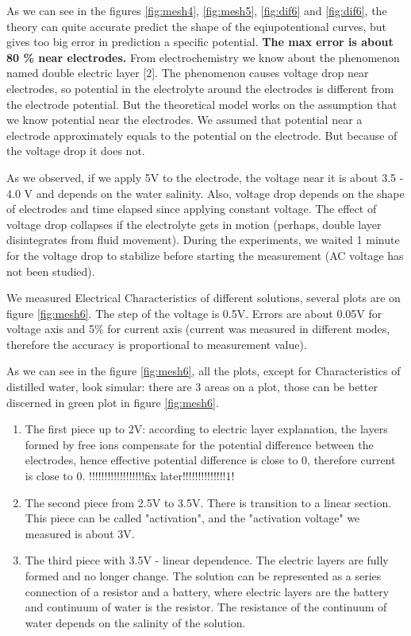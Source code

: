\documentclass{article}
\begin{document}
As we can see in the figures \ref{fig:mesh4}, \ref{fig:mesh5}, \ref{fig:dif6} and \ref{fig:dif6}, the theory can quite accurate predict the shape of the eqiupotentional curves, but gives too big error in prediction a specific potential. \textbf{The max error is about 80 \% near electrodes.} From electrochemistry we know about the phenomenon named double electric layer [2]. The phenomenon causes voltage drop near electrodes, so potential in the electrolyte around the electrodes is different from the electrode potential. But the theoretical model works on the assumption that we know potential near the electrodes. We assumed that potential near a electrode approximately equals to the potential on the electrode. But because of the voltage drop it does not. \par

As we observed, if we apply 5V to the electrode, the voltage near it is about 3.5 - 4.0 V and depends on the water salinity. Also, voltage drop depends on the shape of electrodes and time elapsed since applying constant voltage. The effect of voltage drop collapses if the electrolyte gets in motion (perhaps, double layer disintegrates from fluid movement). During the experiments, we waited 1 minute for the voltage drop to stabilize before starting the measurement (AC voltage has not been studied).\par

We measured Electrical Characteristics of different solutions, several plots are on figure \ref{fig:mesh6}. The step of the voltage is 0.5V. Errors are about 0.05V for voltage axis and 5\% for current axis (current was measured in different modes, therefore the accuracy is proportional to measurement value).

As we can see in the figure \ref{fig:mesh6}, all the plots, except for Characteristics of distilled water, look simular: there are 3 areas on a plot, those can be better discerned in green plot in figure \ref{fig:mesh6}. 

\begin{enumerate}   
\item The first piece up to 2V: according to electric layer explanation, the layers formed by free ions compensate for the potential difference between the electrodes, hence effective potential difference is close to 0, therefore current is close to 0.    !!!!!!!!!!!!!!!!!!fix later!!!!!!!!!!!!!!1!

\item The second piece from 2.5V to 3.5V. There is transition to a linear section. This piece can be called "activation", and the "activation voltage" we measured is about 3V.

\item The third piece with 3.5V - linear dependence. The electric layers are fully formed and no longer change. The solution can be represented as a series connection of a resistor and a battery, where electric layers are the battery and continuum of water is the resistor. The resistance of the continuum of water depends on the salinity of the solution.
\end{enumerate}
\end{document}
